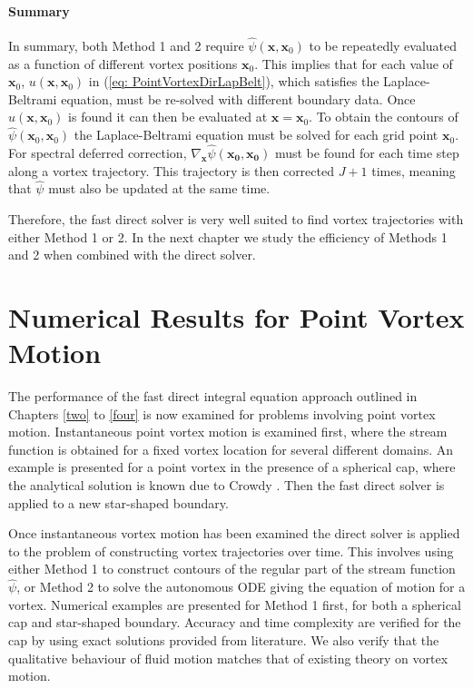 \documentclass{sfuthesis}
\begin{document}

\subsubsection{Summary}
In summary, both Method 1 and 2 require $\hat{\psi}(\mathbf{x},\mathbf{x}_0)$ to be repeatedly evaluated as a function of different vortex positions $\mathbf{x}_0$. This implies that for each value of $\mathbf{x}_0$, $u(\mathbf{x}, \mathbf{x}_0)$ in (\ref{eq: PointVortexDirLapBelt}), which satisfies the Laplace-Beltrami equation, must be re-solved with different boundary data. Once $u(\mathbf{x}, \mathbf{x}_0)$ is found it can then be evaluated at $\mathbf{x}=\mathbf{x}_0$. To obtain the contours of $\hat{\psi}(\mathbf{x}_0, \mathbf{x}_0)$ the Laplace-Beltrami equation must be solved for each grid point $\mathbf{x}_0$. For spectral deferred correction, ${\nabla}_\mathbf{x}\hat{\psi}(\mathbf{x_0},\mathbf{x_0})$ must be found for each time step along a vortex trajectory. This trajectory is then corrected $J+1$ times, meaning that $\hat{\psi}$ must also be updated at the same time.

Therefore, the fast direct solver is very well suited to find vortex trajectories with either Method 1 or 2. In the next chapter we study the efficiency of Methods 1 and 2 when combined with the direct solver. 

\chapter{Numerical Results for Point Vortex Motion}
\label{six}
The performance of the fast direct integral equation approach outlined in Chapters \ref{two} to \ref{four} is now examined for problems involving point vortex motion. Instantaneous point vortex motion is examined first, where the stream function is obtained for a fixed vortex location for several different domains. An example is presented for a point vortex in the presence of a spherical cap, where the analytical solution is known due to Crowdy \cite{Crowdy2006}. Then the fast direct solver is applied to a new star-shaped boundary. 

Once instantaneous vortex motion has been examined the direct solver is applied to the problem of constructing vortex trajectories over time. This involves using either Method 1 to construct contours of the regular part of the stream function $\hat{\psi}$, or Method 2 to solve the autonomous ODE giving the equation of motion for a vortex. Numerical examples are presented for Method 1 first, for both a spherical cap and star-shaped boundary. Accuracy and time complexity are verified for the cap by using exact solutions provided from literature. We also verify that the qualitative behaviour of fluid motion matches that of existing theory on vortex motion. 
\end{document}
